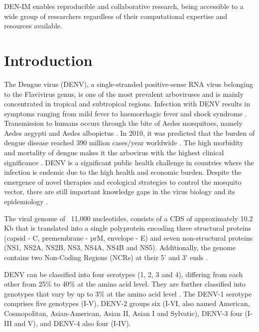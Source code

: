DEN-IM enables reproducible and collaborative research, being accessible to a wide group of researchers regardless of their computational expertise and resources available.

\section{Introduction}

The Dengue virus (DENV), a single-stranded positive-sense RNA virus belonging to the Flavivirus genus, is one of the most prevalent arboviruses and is mainly concentrated in tropical and subtropical regions. Infection with DENV results in symptoms ranging from mild fever to haemorrhagic fever and shock syndrome \citep{organization_dengue_2009}. Transmission to humans occurs through the bite of Aedes mosquitoes, namely Aedes aegypti and Aedes albopictus \citep{diamond_molecular_2015}. In 2010, it was predicted that the burden of dengue disease reached 390 million cases/year worldwide \citep{bhatt_global_2013}. The high morbidity and mortality of dengue makes it the arbovirus with the highest clinical significance \citep{lourenco_challenges_2018}. DENV is a significant public health challenge in countries where the infection is endemic due to the high health and economic burden. Despite the emergence of novel therapies and ecological strategies to control the mosquito vector, there are still important knowledge gaps in the virus biology and its epidemiology \citep{diamond_molecular_2015}.

The viral genome of ~11,000 nucleotides, consists of a CDS of approximately 10.2 Kb that is translated into a single polyprotein encoding three structural proteins (capsid - C, premembrane - prM, envelope - E) and seven non-structural proteins (NS1, NS2A, NS2B, NS3, NS4A, NS4B and NS5). Additionally, the genome contains two Non-Coding Regions (NCRs) at their 5’ and 3’ ends \citep{leitmeyer_dengue_1999}.

DENV can be classified into four serotypes (1, 2, 3 and 4), differing from each other from 25\% to 40\% at the amino acid level. They are further classified into genotypes that vary by up to 3\% at the amino acid level \citep{diamond_molecular_2015}. The DENV-1 serotype comprises five genotypes (I-V), DENV-2 groups six (I-VI, also named American, Cosmopolitan, Asian-American, Asian II, Asian I and Sylvatic), DENV-3 four (I-III and V), and DENV-4 also four (I-IV).

